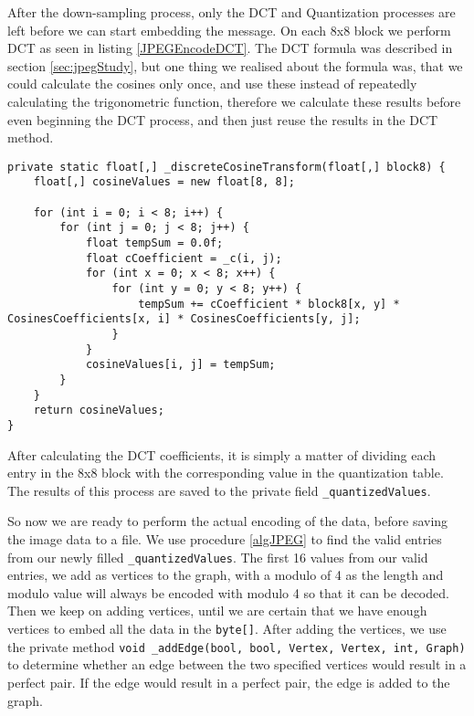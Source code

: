 After the down-sampling process, only the DCT and Quantization processes are left before we can start embedding the message.
On each 8x8 block we perform DCT as seen in listing \ref{JPEGEncodeDCT}.
The DCT formula was described in section \ref{sec:jpegStudy}, but one thing we realised about the formula was, that we could calculate the cosines only once, and use these instead of repeatedly calculating the trigonometric function, therefore we calculate these results before even beginning the DCT process, and then just reuse the results in the DCT method.
 

\begin{lstlisting}[firstnumber=603,label=JPEGEncodeDCT, caption={Multidimensional DCT on 8x8 block \textbf{File: }JPEGImage.cs}]
private static float[,] _discreteCosineTransform(float[,] block8) {
    float[,] cosineValues = new float[8, 8];

    for (int i = 0; i < 8; i++) {
        for (int j = 0; j < 8; j++) {
            float tempSum = 0.0f;
            float cCoefficient = _c(i, j);
            for (int x = 0; x < 8; x++) {
                for (int y = 0; y < 8; y++) {
                    tempSum += cCoefficient * block8[x, y] * CosinesCoefficients[x, i] * CosinesCoefficients[y, j];
                }
            }
            cosineValues[i, j] = tempSum;
        }
    }
    return cosineValues;
}
\end{lstlisting}

After calculating the DCT coefficients, it is simply a matter of dividing each entry in the 8x8 block with the corresponding value in the quantization table.
The results of this process are saved to the private field \lstinline|_quantizedValues|.

So now we are ready to perform the actual encoding of the data, before saving the image data to a file.
We use procedure \ref{algJPEG} to find the valid entries from our newly filled \lstinline|_quantizedValues|.
The first 16 values from our valid entries, we add as vertices to the graph, with a modulo of 4 as the length and modulo value will always be encoded with modulo 4 so that it can be decoded.
Then we keep on adding vertices, until we are certain that we have enough vertices to embed all the data in the \lstinline|byte[]|.
After adding the vertices, we use the private method \lstinline|void _addEdge(bool, bool, Vertex, Vertex, int, Graph)| to determine whether an edge between the two specified vertices would result in a perfect pair.
If the edge would result in a perfect pair, the edge is added to the graph.

